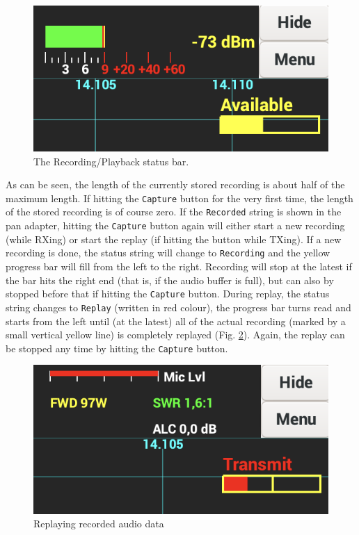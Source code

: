 \documentclass[12pt]{book}
\def\rett#1{\texttt{\color{red}#1}}
\def\bltt#1{\texttt{\color{blue}#1}}
\begin{document}
\begin{figure}[ht]
\center
\includegraphics[scale=0.45]{Capture1.png}
\caption{The Recording/Playback status bar.}
\label{fig:capture1}
\end{figure}

As can be seen, the length of the currently stored recording is about half of the maximum length. If hitting
the \bltt{Capture} button for the very first time, the length of the stored recording is of course zero. If
the \rett{Recorded} string is shown in the pan adapter, hitting the \bltt{Capture} button again will either
start a new recording (while RXing) or start the replay (if hitting the button while TXing).
If a new recording is done, the status string will change to \rett{Recording} and the yellow progress bar
will fill from the left to the right. Recording will stop at the latest if the bar hits the right end
(that is, if the audio buffer is full), but can also by stopped before that if hitting the \bltt{Capture}
button. During replay, the status string changes to \rett{Replay} (written in red colour), the progress bar
turns read and starts from the left until (at the latest) all of the actual recording (marked by a small
vertical yellow line) is completely replayed (Fig. \ref{fig:capture2}). Again, the replay can be stopped any time by hitting
the \bltt{Capture} button.

\begin{figure}[ht]
\center
\includegraphics[scale=0.45]{Capture2.png}
\caption{Replaying recorded audio data}
\label{fig:capture2}
\end{figure}
\end{document}
